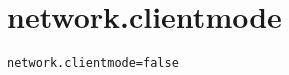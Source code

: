 \section{network.clientmode}
\label{configuration:NetworkClientmode}
\AvailableInJavaAndCsharp{\TODO}
\begin{lstlisting}[style=Props,caption={Usage example for \textit{network.clientmode}}]
network.clientmode=false
\end{lstlisting}